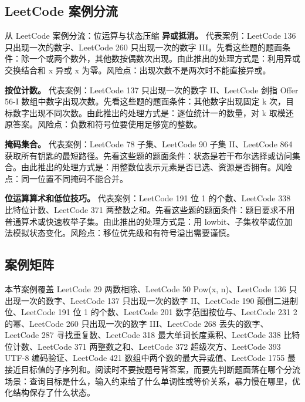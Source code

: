 \subsection{LeetCode 案例分流}

\begin{principlebox}{从 LeetCode 案例分流：位运算与状态压缩}
\textbf{异或抵消。}
代表案例：LeetCode 136 只出现一次的数字、LeetCode 260 只出现一次的数字 III。先看这些题的题面条件：除一个或两个数外，其他数按偶数次出现。由此推出的处理方式是：利用异或交换结合和 x 异或 x 为零。风险点：出现次数不是两次时不能直接异或。

\textbf{按位计数。}
代表案例：LeetCode 137 只出现一次的数字 II、LeetCode 剑指 Offer 56-I 数组中数字出现次数。先看这些题的题面条件：其他数字出现固定 k 次，目标数字出现不同次数。由此推出的处理方式是：逐位统计一的数量，对 k 取模还原答案。风险点：负数和符号位要使用足够宽的整数。

\textbf{掩码集合。}
代表案例：LeetCode 78 子集、LeetCode 90 子集 II、LeetCode 864 获取所有钥匙的最短路径。先看这些题的题面条件：状态是若干布尔选择或访问集合。由此推出的处理方式是：用整数位表示元素是否已选、资源是否拥有。风险点：同一位置不同掩码不能合并。

\textbf{位运算算术和低位技巧。}
代表案例：LeetCode 191 位 1 的个数、LeetCode 338 比特位计数、LeetCode 371 两整数之和。先看这些题的题面条件：题目要求不用普通算术或快速枚举子集。由此推出的处理方式是：用 lowbit、子集枚举或位加法模拟状态变化。风险点：移位优先级和有符号溢出需要谨慎。

\end{principlebox}

\subsection{案例矩阵}

本节案例覆盖 LeetCode 29 两数相除、LeetCode 50 Pow(x, n)、LeetCode 136 只出现一次的数字、LeetCode 137 只出现一次的数字 II、LeetCode 190 颠倒二进制位、LeetCode 191 位 1 的个数、LeetCode 201 数字范围按位与、LeetCode 231 2 的幂、LeetCode 260 只出现一次的数字 III、LeetCode 268 丢失的数字、LeetCode 287 寻找重复数、LeetCode 318 最大单词长度乘积、LeetCode 338 比特位计数、LeetCode 371 两整数之和、LeetCode 372 超级次方、LeetCode 393 UTF-8 编码验证、LeetCode 421 数组中两个数的最大异或值、LeetCode 1755 最接近目标值的子序列和。阅读时不要按题号背答案，而要先判断题面落在哪个分流场景：查询目标是什么，输入约束给了什么单调性或等价关系，暴力慢在哪里，优化结构保存了什么状态。

